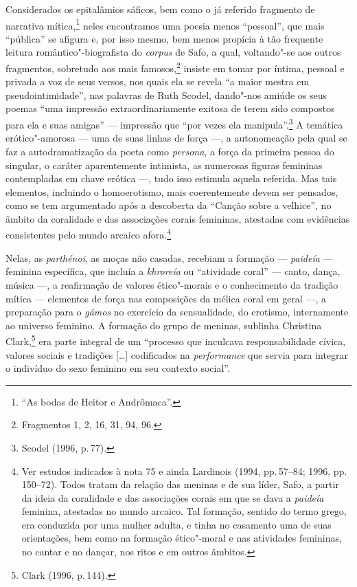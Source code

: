 Considerados os epitalâmios sáficos, bem como o já referido fragmento de
narrativa mítica,\footnote{``As bodas de Heitor e Andrômaca''.} neles
encontramos uma poesia menos “pessoal”, que mais ``pública'' se afigura e, por isso mesmo, bem menos propícia à tão frequente leitura romântico"-biografista do \emph{corpus} de
Safo, a qual, voltando"-se aos outros fragmentos, sobretudo aos mais famosos,\footnote{Fragmentos 1, 2, 16, 31, 94, 96.} insiste em tomar por íntima, pessoal e privada a voz de seus versos, nos quais ela se revela “a maior mestra em pseudointimidade”, nas palavras de Ruth Scodel, dando"-nos amiúde os seus poemas “uma impressão extraordinariamente exitosa de terem sido compostos para ela e suas amigas” --- impressão que “por vezes ela manipula”.\footnote{Scodel (1996, p.\,77).}
A temática
erótico"-amorosa --- uma de suas linhas de força ---, a autonomeação
pela qual se faz a autodramatização da poeta como \emph{persona}, a força da primeira pessoa do singular, o caráter
aparentemente intimista, as numerosas figuras
femininas contempladas em chave erótica ---, tudo isso estimula aquela referida.
Mas tais elementos, incluindo o homoerotismo, mais coerentemente devem ser pensados, como se tem argumentado após a descoberta da ``Canção sobre a velhice'', no âmbito da coralidade e das associações corais femininas, atestadas com evidências consistentes pelo mundo arcaico afora.\footnote{Ver estudos indicados à nota 75 e ainda Lardinois (1994, pp.\,57--84; 1996, pp.\,150--72). Todos tratam da relação das meninas e de sua líder, Safo, a partir da ideia da coralidade e das associações corais em que se dava a \emph{paideía} feminina, atestadas no mundo arcaico. Tal formação, sentido do termo grego, era conduzida por uma mulher adulta, e tinha no casamento uma de suas orientações, bem como na formação ético"-moral e nas atividades femininas, no cantar e no dançar, nos ritos e em outros âmbitos.} 

Nelas, as \emph{parthénoi}, as moças não casadas, recebiam a formação --- \emph{paideía} --- feminina específica, que incluía a \emph{khroreía} ou ``atividade coral'' --- canto, dança, música ---, a reafirmação de valores ético"-morais e o conhecimento da tradição mítica --- elementos de força nas composições da mélica coral em geral ---, a preparação para o \emph{gámos} no exercício da sensualidade, do erotismo, internamente ao universo feminino. A formação do grupo de meninas, sublinha Christina Clark,\footnote{Clark (1996, p.\,144).} era parte integral de um “processo que inculcava responsabilidade cívica, valores sociais e tradições {[}\ldots{}{]} codificados na \emph{performance} que servia para integrar o indivíduo do sexo feminino em seu contexto social”.


